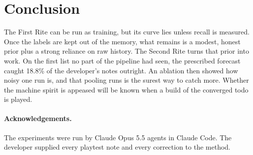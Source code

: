\documentclass[10pt]{article}
\begin{document}
\section{Conclusion}

The First Rite can be run as training, but its curve lies unless recall is measured. Once the labels are kept out of the memory, what remains is a modest, honest prior plus a strong reliance on raw history. The Second Rite turns that prior into work. On the first list no part of the pipeline had seen, the prescribed forecast caught 18.8\% of the developer's notes outright. An ablation then showed how noisy one run is, and that pooling runs is the surest way to catch more. Whether the machine spirit is appeased will be known when a build of the converged todo is played.

\paragraph{Acknowledgements.} The experiments were run by Claude Opus 5.5 agents in Claude Code. The developer supplied every playtest note and every correction to the method.



\end{document}
